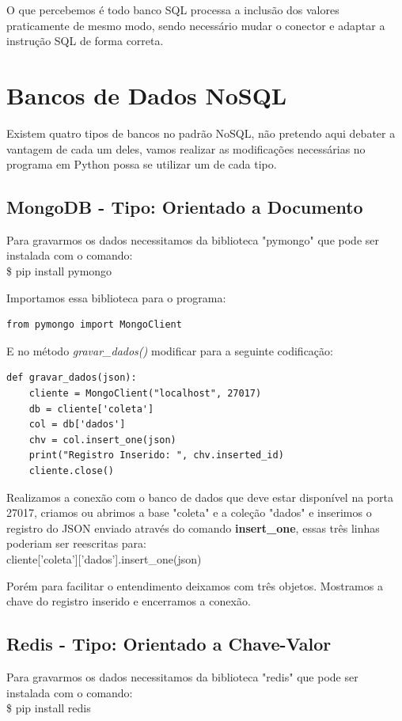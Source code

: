 \documentclass[a4paper,11pt]{article}
\begin{document}
O que percebemos é todo banco SQL processa a inclusão dos valores praticamente de mesmo modo, sendo necessário mudar o conector e adaptar a instrução SQL de forma correta.

\section*{Bancos de Dados NoSQL}
Existem quatro tipos de bancos no padrão NoSQL, não pretendo aqui debater a vantagem de cada um deles, vamos realizar as modificações necessárias no programa em Python possa se utilizar um de cada tipo.

\subsection*{MongoDB - Tipo: Orientado a Documento}
Para gravarmos os dados necessitamos da biblioteca "pymongo" que pode ser instalada com o comando: \\
{\ttfamily\$ pip install pymongo}

Importamos essa biblioteca para o programa:
\begin{lstlisting}[]
from pymongo import MongoClient
\end{lstlisting}

E no método \textit{gravar\_dados()} modificar para a seguinte codificação:
\begin{lstlisting}[]
  def gravar_dados(json):
    cliente = MongoClient("localhost", 27017)
    db = cliente['coleta']
    col = db['dados']
    chv = col.insert_one(json)
    print("Registro Inserido: ", chv.inserted_id)
    cliente.close()	
\end{lstlisting}

Realizamos a conexão com o banco de dados que deve estar disponível na porta 27017, criamos ou abrimos a base "coleta" e a coleção "dados" e inserimos o registro do JSON enviado através do comando \textbf{insert\_one}, essas três linhas poderiam ser reescritas para: \\
{\ttfamily cliente['coleta']['dados'].insert\_one(json)}

Porém para facilitar o entendimento deixamos com três objetos. Mostramos a chave do registro inserido e encerramos a conexão.

\subsection*{Redis - Tipo: Orientado a Chave-Valor}
Para gravarmos os dados necessitamos da biblioteca "redis" que pode ser instalada com o comando: \\
{\ttfamily\$ pip install redis}
\end{document}
